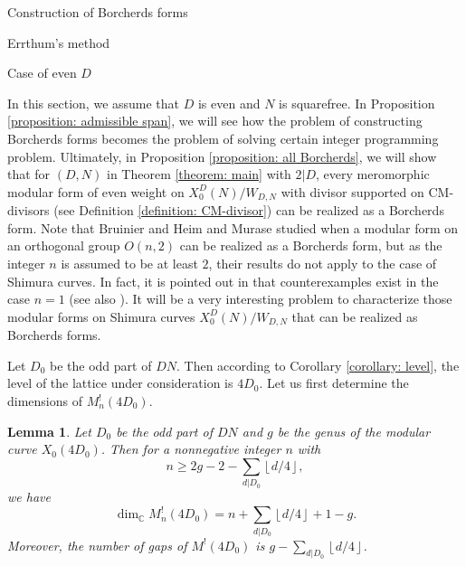 \documentclass{amsart}
\newcounter{lemma}
\newtheorem{Lemma}[lemma]{Lemma}
\theoremstyle{definition}
\def\C{\mathbb C}
\def\gauss#1{\left\lfloor #1\right\rfloor}
\begin{document}
\begin{section}{Construction of Borcherds forms}
\begin{subsection}{Errthum's method}
\end{subsection}

\begin{subsection}{Case of even $D$}
\label{subsection: D even}

In this section, we assume that $D$ is even and $N$ is squarefree.
In Proposition \ref{proposition: admissible span}, we will
see how the problem of constructing Borcherds forms becomes the
problem of solving certain integer programming problem. Ultimately, in
Proposition \ref{proposition: all Borcherds}, we will show that for
$(D,N)$ in Theorem \ref{theorem: main} with $2|D$, every meromorphic
modular form of even weight on $X_0^D(N)/W_{D,N}$ with divisor
supported on CM-divisors (see Definition \ref{definition: CM-divisor})
can be realized as a Borcherds form. Note that Bruinier
\cite{Bruinier-converse} and Heim and Murase \cite{Heim-Murase}
studied when a modular form on an orthogonal group $O(n,2)$ can be
realized as a Borcherds form, but as the integer $n$ is assumed to be
at least $2$, their results do not apply to the case of Shimura
curves. In fact, it is pointed out in
\cite[Section 1]{Bruinier-converse} that counterexamples exist in the
case $n=1$ (see also \cite[Section 8.3]{Bruinier-Ono}).
It will be a very interesting problem to characterize those
modular forms on Shimura curves 
  $X_0^D(N)/W_{D,N}$ that can be realized as Borcherds forms.

Let $D_0$ be the odd part of $DN$. Then according to Corollary
\ref{corollary: level}, the level of the lattice under consideration
is $4D_0$.
 Let us first determine the dimensions of $M^!_n(4D_0)$. 

\begin{Lemma} \label{lemma: dimension}
  Let $D_0$ be the odd part of $DN$ and $g$ be the genus
  of the modular curve $X_0(4D_0)$. Then for a nonnegative integer
  $n$ with
  $$
    n\ge 2g-2-\sum_{d|D_0}\gauss{d/4},
  $$
  we have
  $$
    \dim_\C M^!_n(4D_0)=n+\sum_{d|D_0}\gauss{d/4}+1-g.
  $$
  Moreover, the number of gaps of $M^!(4D_0)$ is $g-\sum_{d|D_0}\gauss{d/4}$.
\end{Lemma}


\end{subsection}
\end{section}
\end{document}
